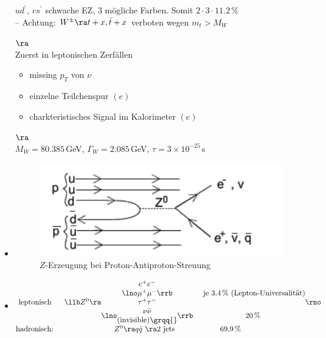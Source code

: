 \begin{itemize}
$ud^\prime,\ cs^\prime$ schwache EZ, 3 mögliche Farben. Somit $2 \cdot 3 \cdot 11.2\,\%$\\
-- Achtung: $W^\pm \ra t+x,\bar{t}+x$ verboten wegen $m_t > M_W$
\item[$\ra$] \\
Zuerst in leptonischen Zerfällen
\begin{itemize}
\item \glqq missing $p_T$\grqq{} von $\nu$
\item einzelne Teilchenspur $(e)$
\item charkteristisches Signal im Kalorimeter $(e)$
\end{itemize}
\item[$\ra$] \\
$M_W= 80.385$\,GeV, $\Gamma_W = 2.085$\,GeV, $\tau = 3\times 10^{-25}$\,s
\item {}

\begin{figure}[!ht]
\centering
\includegraphics[width=.5\textwidth]{imgs/ep5-fig-8-17.pdf}
\caption{$Z$-Erzeugung bei Proton-Antiproton-Streuung\label{fig:8.17}}
\end{figure}

\item {}
\begin{align*}
\begin{matrix}
\text{leptonisch } & \llb Z^0 \ra  \begin{matrix}
\lno\begin{matrix}
e^+e^-\\ \mu^+\mu^- \\ \tau^+ \tau^-
\end{matrix}\rrb &\text{ je 3.4\,\% (Lepton-Universalität)}\\
\lno\begin{matrix}
\nu \bar{\nu}\\ \text{(invisible)\grqq{}}
\end{matrix}\rrb & 20\,\%
\end{matrix}\rno \\
\text{hadronisch: } & Z^0 \ra q\bar{q}\ \ra 2\text{ jets}\qquad \qquad \qquad 69.9\,\% \qquad \qquad
\end{matrix}
\end{align*}


\end{itemize}
